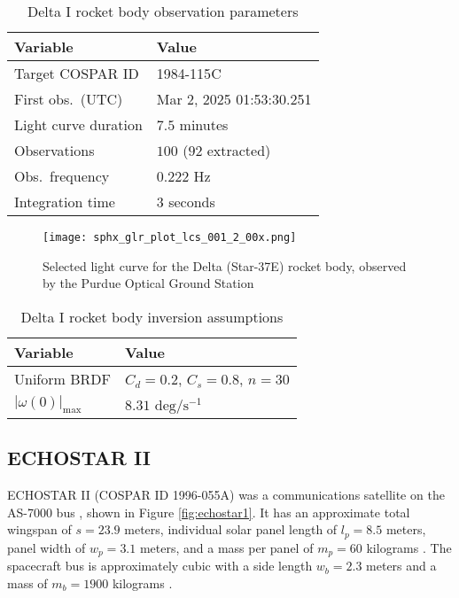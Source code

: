 \documentclass[a4paper,twocolumn]{spaceDebrisC} %
\newcommand{\figbig}[0]{0.5\textwidth}
\begin{document}
\begin{table}[H]
  \centering
  \caption{Delta I rocket body observation parameters}
  \vspace*{6pt}
  \begin{tabular}{|l|l|}
  \hline
  \textbf{Variable} & \textbf{Value} \\ \hline
  Target COSPAR ID & 1984-115C \\ \hline
  First obs.\ (UTC) & Mar 2, 2025 01:53:30.251 \\ \hline
  Light curve duration & $7.5$ minutes \\ \hline
  Observations & $100$ ($92$ extracted) \\ \hline
  Obs.\ frequency & $0.222$ Hz \\ \hline
  Integration time & $3$ seconds \\ \hline
  \end{tabular}
  \label{tb:case1_in}
\end{table}

\begin{figure}[H]
  \centering
  \texttt{[image: sphx\_glr\_plot\_lcs\_001\_2\_00x.png]}
  \caption{Selected light curve for the Delta (Star-37E) rocket body, observed by the Purdue Optical Ground Station}
  \label{fig:rb_lc_obs}
\end{figure}

\begin{table}[H]
  \centering
  \caption{Delta I rocket body inversion assumptions}
  \vspace*{6pt}
  \begin{tabular}{|l|l|}
  \hline
  \textbf{Variable} & \textbf{Value} \\ \hline
  Uniform BRDF & $C_d=0.2$, $C_s=0.8$, $n=30$ \\ \hline
  $|\omega(0)|_\text{max}$ & $8.31$ $\text{deg} / \text{s}^{-1}$ \\ \hline
  \end{tabular}
  \label{tb:case1_ass}
\end{table}


\subsection{ECHOSTAR II}

ECHOSTAR II (COSPAR ID 1996-055A) was a communications satellite on the AS-7000 bus \cite{as7000_astronautix}, shown in Figure \ref{fig:echostar1}. It has an approximate total wingspan of $s = 23.9$ meters, individual solar panel length of $l_p=8.5$ meters, panel width of $w_p=3.1$ meters, and a mass per panel of $m_p = 60$ kilograms \cite{earl2015}. The spacecraft bus is approximately cubic with a side length $w_b=2.3$ meters and a mass of $m_b = 1900$ kilograms \cite{earl2015}.
\end{document}
